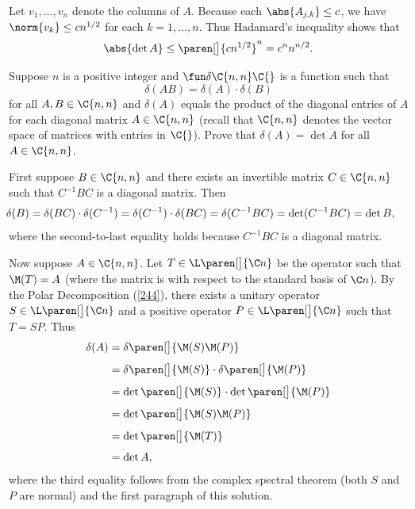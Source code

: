 \begin{Solution}
Let $v_1, \ldots, v_n$ denote the columns of $A$. Because each $\abs{A_{j,k}} \le c$, we have $\norm{v_k} \le c n^{1/2}$ for
each $k=1, \ldots, n$. Thus Hadamard's inequality shows that
\[
\abs{ \det A } \le \paren[\big]{c n^{1/2}}^n = c^n n^{n/2}.
\]
\end{Solution}

\exercise
Suppose $n$ is a positive integer and $\fun \delta {\C{n,n}} {\C{}}$ is a function such that
\[
\delta(AB) = \delta(A) \cdot \delta(B)
\]
for all $A, B \in \C{n,n}$ and $\delta(A)$ equals the product of the diagonal entries of $A$ for each diagonal matrix $A \in \C{n,n}$ (recall that $\C{n,n}$ denotes the vector space of  matrices with entries in $\C{}$). Prove that
$\delta(A) = \det A$ for all $A \in \C{n,n}$.

First suppose $B \in \C{n,n}$ and there exists an invertible matrix $C \in \C{n,n}$ such that $C^{-1} B C$ is a diagonal matrix. Then
\[ \hspace*{-.2in}
\delta(B) = \delta(BC) \cdot \delta(C^{-1}) = \delta(C^{-1}) \cdot \delta(BC) = \delta( C^{-1} B C) = \det( C^{-1} B C) = \det B,
\]
where the second-to-last equality holds because  $C^{-1} B C$ is a diagonal matrix.

Now suppose $A \in \C{n,n}$. Let $T \in \L\paren[\big]{\C n}$ be the operator such that $\M(T) = A$ (where the matrix is with respect to the standard basis of $\C n$). By the Polar Decomposition (\ref{244}), there exists a unitary operator $S \in \L\paren[\big]{\C n}$ and a positive operator $P \in \L\paren[\big]{\C n}$ such that $T = SP$. Thus
\begin{align*}
\delta(A) &= \delta\paren[\big]{ \M(S) \M(P) } \\[4bp]
&=  \delta\paren[\big]{ \M(S) } \cdot  \delta\paren[\big]{ \M(P) }\\[4bp]
&=  \det\paren[\big]{ \M(S) } \cdot  \det\paren[\big]{ \M(P) } \\[4bp]
&= \det\paren[\big]{ \M(S) \M(P) } \\[4bp]
&= \det \paren[\big]{ \M(T) } \\[4bp]
&= \det A,
\end{align*}
where the third equality follows from the complex spectral theorem (both $S$ and $P$ are normal) and the first paragraph of this solution.

